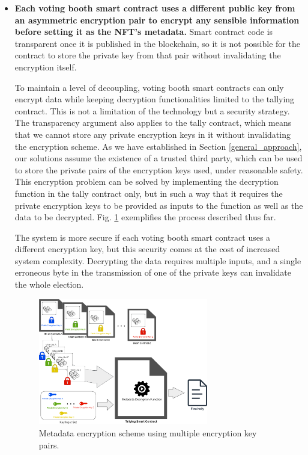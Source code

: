 \documentclass[./4_GeneralApproach.tex]{subfiles}
\begin{document}
    \begin{itemize}
        \item{\textbf{Each voting booth smart contract uses a different public key from an asymmetric encryption pair to encrypt any sensible information before setting it as the NFT's metadata.} Smart contract code is transparent once it is published in the blockchain, so it is not possible for the contract to store the private key from that pair without invalidating the encryption itself.
        \par
        To maintain a level of decoupling, voting booth smart contracts can only encrypt data while keeping decryption functionalities limited to the tallying contract. This is not a limitation of the technology but a security strategy. The transparency argument also applies to the tally contract, which means that we cannot store any private encryption keys in it without invalidating the encryption scheme. As we have established in Section \ref{general_approach}, our solutions assume the existence of a trusted third party, which can be used to store the private pairs of the encryption keys used, under reasonable safety. This encryption problem can be solved by implementing the decryption function in the tally contract only, but in such a way that it requires the private encryption keys to be provided as inputs to the function as well as the data to be decrypted. Fig. \ref{fig:multiple_encryption_key_scheme} exemplifies the process described thus far.
        \par
        The system is more secure if each voting booth smart contract uses a different encryption key, but this security comes at the cost of increased system complexity. Decrypting the data requires multiple inputs, and a single erroneous byte in the transmission of one of the private keys can invalidate the whole election.
        }

        \begin{figure}[htp]
            \centering
            \includegraphics[width=0.7\textwidth]{../Images/ContractBasedSolution_encryption1.png}
            \caption{Metadata encryption scheme using multiple encryption key pairs.}
            \label{fig:multiple_encryption_key_scheme}
        \end{figure}                
        

\end{itemize}
\end{document}
